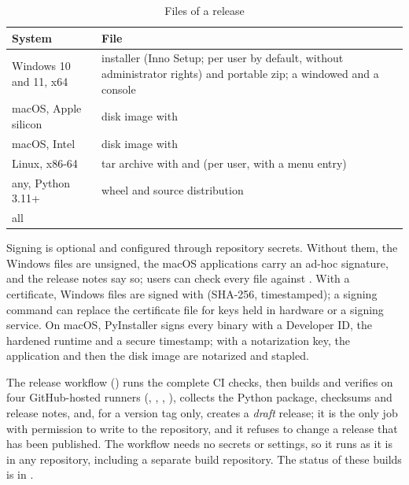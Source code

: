 \begin{table}[t]
\caption{Files of a release}\label{tab:release}
\centering\footnotesize
\begin{tabular}{@{}L{29mm}L{51mm}@{}}
\toprule
\textbf{System} & \textbf{File} \\
\midrule
Windows 10 and 11, x64 & installer (Inno Setup; per user by default, without administrator rights)
and portable zip; a windowed  and a console  \\ \addlinespace[1.6pt]
macOS, Apple silicon & disk image with  \\ \addlinespace[1.6pt]
macOS, Intel & disk image with  \\ \addlinespace[1.6pt]
Linux, x86-64 & tar archive with  and  (per user, with a menu
entry) \\ \addlinespace[1.6pt]
any, Python 3.11+ & wheel and source distribution \\ \addlinespace[1.6pt]
all &  \\
\bottomrule
\end{tabular}
\end{table}

Signing is optional and configured through repository secrets. Without them, the Windows files are
unsigned, the macOS applications carry an ad-hoc signature, and the release notes say so; users can
check every file against . With a certificate, Windows files are signed with
 (SHA-256, timestamped); a signing command can replace the certificate file for keys
held in hardware or a signing service. On macOS, PyInstaller signs every binary with a Developer ID,
the hardened runtime and a secure timestamp; with a notarization key, the application and then the
disk image are notarized and stapled.

The release workflow () runs the complete CI checks, then builds
and verifies on four GitHub-hosted runners (, , ,
),
collects the Python package, checksums and release notes, and, for a version tag only, creates a
\emph{draft} release; it is the only job with permission to write to the repository, and it refuses
to change a release that has been published. The workflow needs no secrets or settings, so it runs
as it is in any repository, including a separate build repository. The status of these builds is
in .
